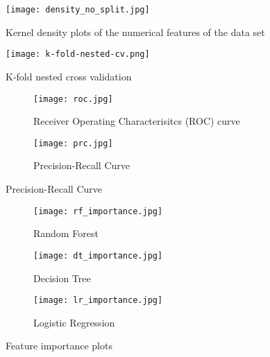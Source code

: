 \begin{figure}[ht]
    \centering
    \texttt{[image: density\_no\_split.jpg]}
    \caption{Kernel density plots of the numerical features of the data set}
    \label{fig:density}
\end{figure}
\begin{figure}[ht]
 \centering
 \texttt{[image: k-fold-nested-cv.png]}
 \caption{K-fold nested cross validation}
 \label{fig:cv}
\end{figure}
\begin{figure}
 \centering
 \begin{subfigure}{0.5\textwidth}
  \centering
  \texttt{[image: roc.jpg]}
  \caption{Receiver Operating Characterisitcs (ROC) curve}
  \label{fig:roc}
 \end{subfigure}
 \begin{subfigure}{0.5\textwidth}
  \centering
  \texttt{[image: prc.jpg]}
  \caption{Precision-Recall Curve}
  \label{fig:prc}
 \end{subfigure}
\end{figure}

\begin{figure}
 \begin{subfigure}{0.5\textwidth}
  \texttt{[image: rf\_importance.jpg]}
  \caption{Random Forest}
  \label{fig:rf_importance}
 \end{subfigure}
 \begin{subfigure}{0.5\textwidth}
  \texttt{[image: dt\_importance.jpg]}
  \caption{Decision Tree}
  \label{fig:dt_importance}
 \end{subfigure}
 \begin{subfigure}{\textwidth}
 \centering
  \texttt{[image: lr\_importance.jpg]}
  \caption{Logistic Regression}
  \label{fig:lr_importance}
 \end{subfigure}
 \caption{Feature importance plots}
 \label{fig:feature-importance}
\end{figure}

